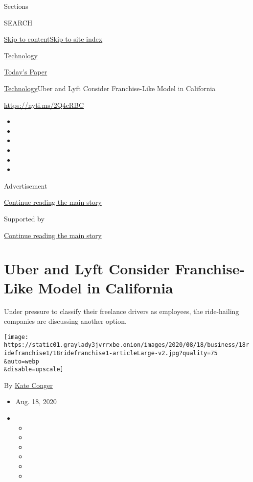Sections

SEARCH

\protect\hyperlink{site-content}{Skip to
content}\protect\hyperlink{site-index}{Skip to site index}

\href{https://www.nytimes3xbfgragh.onion/section/technology}{Technology}

\href{https://myaccount.nytimes3xbfgragh.onion/auth/login?response_type=cookie\&client_id=vi}{}

\href{https://www.nytimes3xbfgragh.onion/section/todayspaper}{Today's
Paper}

\href{/section/technology}{Technology}\textbar{}Uber and Lyft Consider
Franchise-Like Model in California

\url{https://nyti.ms/2Q4cRBC}

\begin{itemize}
\item
\item
\item
\item
\item
\item
\end{itemize}

Advertisement

\protect\hyperlink{after-top}{Continue reading the main story}

Supported by

\protect\hyperlink{after-sponsor}{Continue reading the main story}

\hypertarget{uber-and-lyft-consider-franchise-like-model-in-california}{%
\section{Uber and Lyft Consider Franchise-Like Model in
California}\label{uber-and-lyft-consider-franchise-like-model-in-california}}

Under pressure to classify their freelance drivers as employees, the
ride-hailing companies are discussing another option.

\texttt{[image: https://static01.graylady3jvrrxbe.onion/images/2020/08/18/business/18ridefranchise1/18ridefranchise1-articleLarge-v2.jpg?quality=75\\\&auto=webp\\\&disable=upscale]}

By \href{https://www.nytimes3xbfgragh.onion/by/kate-conger}{Kate Conger}

\begin{itemize}
\item
  Aug. 18, 2020
\item
  \begin{itemize}
  \item
  \item
  \item
  \item
  \item
  \item
  \end{itemize}
\end{itemize}

